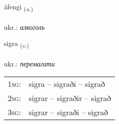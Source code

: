\documentclass[frontgrid, backgrid]{flacards}\usepackage[]{graphicx}\usepackage[]{xcolor}
\begin{document}
{áfengi \small{\textsubscript{(\textit{n.})}} \\[1ex] %
\textphonetic{[auːfeiɲcɪ]} \\
ukr.: \emph{алкоголь} \\  [2ex]
\renewcommand*{\arraystretch}{0.8}
}

\renewcommand{\flhead}{\vskip5pt \fboxsep=0pt {\small\bfseries\footnotesize Sagnorð | дієслово}}
\renewcommand{\fcfoot}{\vskip5pt \fboxsep=0pt \hspace{2pt}{\small\bfseries\footnotesize 2K}}

\renewcommand{\blhead}{\vskip5pt {\small\bfseries\footnotesize Sagnorð | дієслово }}
\renewcommand{\bcfoot}{\vskip5pt \hspace{2pt}{\small\bfseries\footnotesize 2K}}


{sigra \small{\textsubscript{(\textit{v.})}} \\[1ex] %
\textphonetic{[sɪɣra]} \\
ukr.: \emph{перемагати} \\  [2ex]
\renewcommand*{\arraystretch}{0.8}
\begin{tabular}{p{1cm}l}
\textsc{1sg}: & sigra -- sigraði -- sigrað \\ 
\textsc{2sg}: & sigrar -- sigraðir -- sigrað \\ 
\textsc{3sg}: & sigrar -- sigraði -- sigrað \\ 
\end{tabular}
}

\renewcommand{\flhead}{\vskip5pt \fboxsep=0pt {\small\bfseries\footnotesize Sagnorð | дієслово}}
\renewcommand{\fcfoot}{\vskip5pt \fboxsep=0pt \hspace{2pt}{\small\bfseries\footnotesize 2K}}
\end{document}
